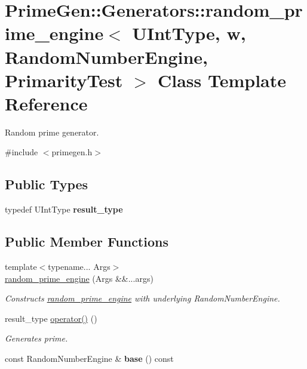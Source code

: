 \hypertarget{class_prime_gen_1_1_generators_1_1random__prime__engine}{\section{Prime\+Gen\+:\+:Generators\+:\+:random\+\_\+prime\+\_\+engine$<$ U\+Int\+Type, w, Random\+Number\+Engine, Primarity\+Test $>$ Class Template Reference}
\label{class_prime_gen_1_1_generators_1_1random__prime__engine}
}


Random prime generator.  




{\ttfamily \#include $<$primegen.\+h$>$}

\subsection*{Public Types}
\begin{DoxyCompactItemize}
\item 
\hypertarget{class_prime_gen_1_1_generators_1_1random__prime__engine_aec9ed908e2670a782f44c2f9c5cf5e50}{typedef U\+Int\+Type {\bfseries result\+\_\+type}}\label{class_prime_gen_1_1_generators_1_1random__prime__engine_aec9ed908e2670a782f44c2f9c5cf5e50}

\end{DoxyCompactItemize}
\subsection*{Public Member Functions}
\begin{DoxyCompactItemize}
\item 
{\footnotesize template$<$typename... Args$>$ }\\\hyperlink{class_prime_gen_1_1_generators_1_1random__prime__engine_ab7addd11d10f5018d08e1341c865aae4}{random\+\_\+prime\+\_\+engine} (Args \&\&...args)
\begin{DoxyCompactList}\small\item\em Constructs {\ttfamily \hyperlink{class_prime_gen_1_1_generators_1_1random__prime__engine}{random\+\_\+prime\+\_\+engine}} with underlying {\ttfamily Random\+Number\+Engine}. \end{DoxyCompactList}\item 
result\+\_\+type \hyperlink{class_prime_gen_1_1_generators_1_1random__prime__engine_a7137cb416c914fcaa29466975ebbc037}{operator()} ()
\begin{DoxyCompactList}\small\item\em Generates prime. \end{DoxyCompactList}\item 
\hypertarget{class_prime_gen_1_1_generators_1_1random__prime__engine_a21fa9301f8f3399c2de1b1e684d7bae3}{const Random\+Number\+Engine \& {\bfseries base} () const }\label{class_prime_gen_1_1_generators_1_1random__prime__engine_a21fa9301f8f3399c2de1b1e684d7bae3}

\end{DoxyCompactItemize}
